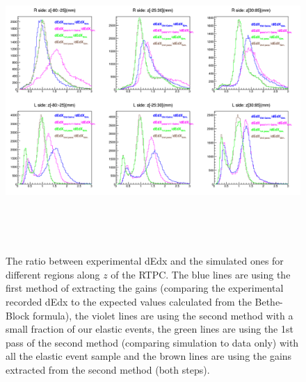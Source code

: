 \begin{figure}[!h]
\hspace{-0.5 cm}
\includegraphics[height=11.5cm]{fig/dedx_ratio_elastic.png}
\caption{The ratio between experimental dEdx and 
the simulated ones for different regions along $z$ of the RTPC. The blue lines 
are using the first method of extracting the gains (comparing the experimental 
recorded dEdx to the expected values calculated from the Bethe-Block formula), 
the violet lines are using the second method with a small fraction of our 
elastic events, the green lines are using the 1st pass of the second method 
(comparing simulation to data only) with all the elastic event sample and the 
brown lines are using the gains extracted from the second method (both steps).}
\label{fig:dedxre}
\end{figure}


